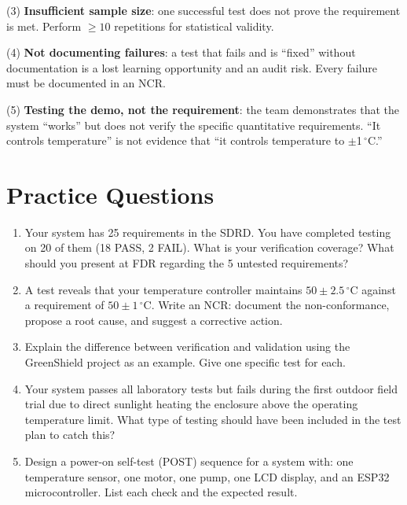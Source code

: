 \documentclass[11pt,letterpaper,twoside,openany]{book}
\newcommand{\degC}{\ensuremath{{}^{\circ}\text{C}}}
\begin{document}
(3) \textbf{Insufficient sample size}: one successful test does not prove the requirement is met. Perform $\geq 10$ repetitions for statistical validity.

(4) \textbf{Not documenting failures}: a test that fails and is ``fixed'' without documentation is a lost learning opportunity and an audit risk. Every failure must be documented in an NCR.

(5) \textbf{Testing the demo, not the requirement}: the team demonstrates that the system ``works'' but does not verify the specific quantitative requirements. ``It controls temperature'' is not evidence that ``it controls temperature to $\pm$1\,\degC{}.''
\section{Practice Questions}
\begin{enumerate}[leftmargin=1.5em]
\item Your system has 25 requirements in the SDRD. You have completed testing on 20 of them (18 PASS, 2 FAIL). What is your verification coverage? What should you present at FDR regarding the 5 untested requirements?
\item A test reveals that your temperature controller maintains $50 \pm 2.5$\,\degC{} against a requirement of $50 \pm 1$\,\degC{}. Write an NCR: document the non-conformance, propose a root cause, and suggest a corrective action.
\item Explain the difference between verification and validation using the GreenShield project as an example. Give one specific test for each.
\item Your system passes all laboratory tests but fails during the first outdoor field trial due to direct sunlight heating the enclosure above the operating temperature limit. What type of testing should have been included in the test plan to catch this?
\item Design a power-on self-test (POST) sequence for a system with: one temperature sensor, one motor, one pump, one LCD display, and an ESP32 microcontroller. List each check and the expected result.
\end{enumerate}
\end{document}
